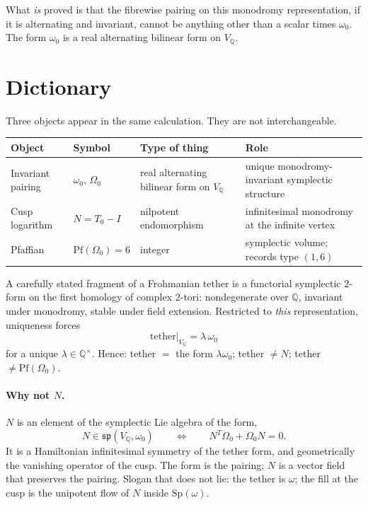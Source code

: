 \documentclass[11pt,a4paper]{article}
\theoremstyle{definition}
\theoremstyle{remark}
\newcommand{\Q}{\mathbb{Q}}
\newcommand{\Pf}{\mathrm{Pf}}
\newcommand{\spq}{\mathfrak{sp}}
\begin{document}
What \emph{is} proved is that the fibrewise pairing on this monodromy representation, if it is alternating and invariant, cannot be anything other than a scalar times $\omega_0$. The form $\omega_0$ is a real alternating bilinear form on $V_{\Q}$.

\section{Dictionary}

Three objects appear in the same calculation. They are not interchangeable.

\begin{center}
\begin{tabular}{llll}
\hline
Object & Symbol & Type of thing & Role \\
\hline
Invariant pairing & $\omega_0$, $\Omega_0$ & real alternating bilinear form on $V_{\Q}$ & unique monodromy-invariant symplectic structure \\
Cusp logarithm & $N=T_0-I$ & nilpotent endomorphism & infinitesimal monodromy at the infinite vertex \\
Pfaffian & $\Pf(\Omega_0)=6$ & integer & symplectic volume; records type $(1,6)$ \\
\hline
\end{tabular}
\end{center}

A carefully stated fragment of a Frohmanian tether is a functorial symplectic $2$-form on the first homology of complex $2$-tori: nondegenerate over $\Q$, invariant under monodromy, stable under field extension. Restricted to \emph{this} representation, uniqueness forces
\[
\text{tether}\big|_{V_{\Q}}=\lambda\,\omega_0
\]
for a unique $\lambda\in\Q^\times$. Hence: tether $=$ the form $\lambda\omega_0$; tether $\neq N$; tether $\neq\Pf(\Omega_0)$.

\paragraph{Why not $N$.}
$N$ is an element of the symplectic Lie algebra of the form,
\[
N\in\spq(V_{\Q},\omega_0)\qquad\Longleftrightarrow\qquad N^T\Omega_0+\Omega_0 N=0.
\]
It is a Hamiltonian infinitesimal symmetry of the tether form, and geometrically the vanishing operator of the cusp. The form is the pairing; $N$ is a vector field that preserves the pairing. Slogan that does not lie: the tether is $\omega$; the fill at the cusp is the unipotent flow of $N$ inside $\mathrm{Sp}(\omega)$.
\end{document}
